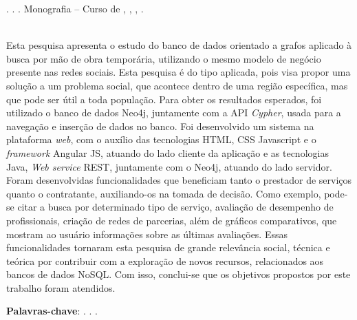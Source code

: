 
\begin{OnehalfSpacing} 

\noindent \imprimirAutorCitacaoMaiuscula. {\bfseries\imprimirtitulo}. {\imprimirdata}.  Monografia -- Curso de {\MakeUppercase\imprimircurso}, {\imprimirinstituicao}, {\imprimirlocal}, {\imprimirdata}.

\vspace{\onelineskip}
\vspace{\onelineskip}
\vspace{\onelineskip}
\vspace{\onelineskip}

\begin{resumo}
~\\
\noindent Esta pesquisa apresenta o estudo do banco de dados orientado a grafos aplicado à busca por mão de obra temporária, utilizando o mesmo modelo de negócio presente nas redes sociais. Esta pesquisa é do tipo aplicada, pois visa propor uma solução a um problema social, que acontece dentro de uma região específica, mas que pode ser útil a toda população. Para obter os resultados esperados, foi utilizado o banco de dados Neo4j, juntamente com a API \textit{Cypher}, usada para a navegação e inserção de dados no banco. Foi desenvolvido um sistema na plataforma \textit{web}, com o auxílio das tecnologias HTML, CSS Javascript e o \textit{framework} Angular JS, atuando do lado cliente da aplicação e as tecnologias Java, \textit{Web service} REST, juntamente com o Neo4j, atuando do lado servidor. Foram desenvolvidas funcionalidades que beneficiam tanto o prestador de serviços quanto o contratante, auxiliando-os na tomada de decisão. Como exemplo, pode-se citar a busca por determinado tipo de serviço, avaliação de desempenho de profissionais, criação de redes de parcerias, além de gráficos comparativos, que mostram ao usuário informações sobre as últimas avaliações. Essas funcionalidades tornaram esta pesquisa de grande relevância social, técnica e teórica por contribuir com a exploração de novos recursos, relacionados aos bancos de dados NoSQL. Com isso, conclui-se que os objetivos propostos por este trabalho foram atendidos.


\vspace{\onelineskip}
\vspace*{\fill}
\noindent \textbf{Palavras-chave}: \imprimirPalavraChaveUm. \imprimirPalavraChaveDois. \imprimirPalavraChaveTres.
\vspace{\onelineskip}
\end{resumo}

\end{OnehalfSpacing}
